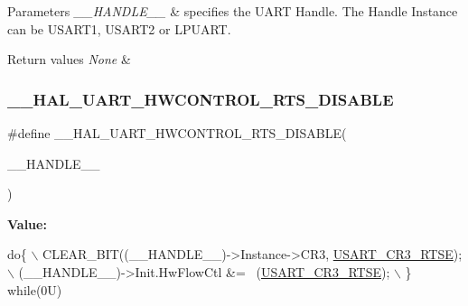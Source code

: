 \begin{DoxyParams}{Parameters}
{\em \+\_\+\+\_\+\+H\+A\+N\+D\+L\+E\+\_\+\+\_\+} & specifies the U\+A\+RT Handle. The Handle Instance can be U\+S\+A\+R\+T1, U\+S\+A\+R\+T2 or L\+P\+U\+A\+RT. \\
\hline
\end{DoxyParams}

\begin{DoxyRetVals}{Return values}
{\em None} & \\
\hline
\end{DoxyRetVals}
\mbox{\label{group___u_a_r_t___exported___macros_ga8c034e96ad8f263cafeb5898ff7311fd}} 
\subsubsection{\texorpdfstring{\+\_\+\+\_\+\+H\+A\+L\+\_\+\+U\+A\+R\+T\+\_\+\+H\+W\+C\+O\+N\+T\+R\+O\+L\+\_\+\+R\+T\+S\+\_\+\+D\+I\+S\+A\+B\+LE}{\_\_HAL\_UART\_HWCONTROL\_RTS\_DISABLE}}
{\footnotesize\ttfamily \#define \+\_\+\+\_\+\+H\+A\+L\+\_\+\+U\+A\+R\+T\+\_\+\+H\+W\+C\+O\+N\+T\+R\+O\+L\+\_\+\+R\+T\+S\+\_\+\+D\+I\+S\+A\+B\+LE(\begin{DoxyParamCaption}\item[{}]{\+\_\+\+\_\+\+H\+A\+N\+D\+L\+E\+\_\+\+\_\+ }\end{DoxyParamCaption})}

{\bfseries Value\+:}
\begin{DoxyCode}
\textcolor{keywordflow}{do}\{                                                      \(\backslash\)
    CLEAR\_BIT((\_\_HANDLE\_\_)->Instance->CR3, \mbox{\hyperlink{group___peripheral___registers___bits___definition_ga7c5d6fcd84a4728cda578a0339b4cac2}{USART\_CR3\_RTSE}});\(\backslash\)
    (\_\_HANDLE\_\_)->Init.HwFlowCtl &= ~(\mbox{\hyperlink{group___peripheral___registers___bits___definition_ga7c5d6fcd84a4728cda578a0339b4cac2}{USART\_CR3\_RTSE}});     \(\backslash\)
  \} \textcolor{keywordflow}{while}(0U)
\end{DoxyCode}


